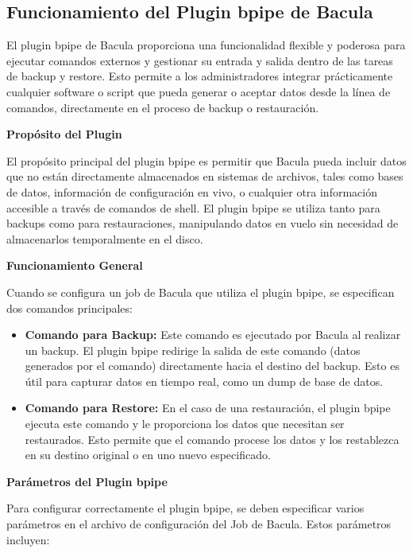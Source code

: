 \subsection{Funcionamiento del Plugin bpipe de Bacula}

El plugin bpipe de Bacula proporciona una funcionalidad flexible y poderosa para ejecutar comandos externos y gestionar su entrada y salida dentro de las tareas de backup y restore. Esto permite a los administradores integrar prácticamente cualquier software o script que pueda generar o aceptar datos desde la línea de comandos, directamente en el proceso de backup o restauración.

\textbf{Propósito del Plugin}

El propósito principal del plugin bpipe es permitir que Bacula pueda incluir datos que no están directamente almacenados en sistemas de archivos, tales como bases de datos, información de configuración en vivo, o cualquier otra información accesible a través de comandos de shell. El plugin bpipe se utiliza tanto para backups como para restauraciones, manipulando datos en vuelo sin necesidad de almacenarlos temporalmente en el disco.

\textbf{Funcionamiento General}

Cuando se configura un job de Bacula que utiliza el plugin bpipe, se especifican dos comandos principales:

\begin{itemize}
    \item \textbf{Comando para Backup:} Este comando es ejecutado por Bacula al realizar un backup. El plugin bpipe redirige la salida de este comando (datos generados por el comando) directamente hacia el destino del backup. Esto es útil para capturar datos en tiempo real, como un dump de base de datos.
    
    \item \textbf{Comando para Restore:} En el caso de una restauración, el plugin bpipe ejecuta este comando y le proporciona los datos que necesitan ser restaurados. Esto permite que el comando procese los datos y los restablezca en su destino original o en uno nuevo especificado.
\end{itemize}

\textbf{Parámetros del Plugin bpipe}

Para configurar correctamente el plugin bpipe, se deben especificar varios parámetros en el archivo de configuración del Job de Bacula. Estos parámetros incluyen:

